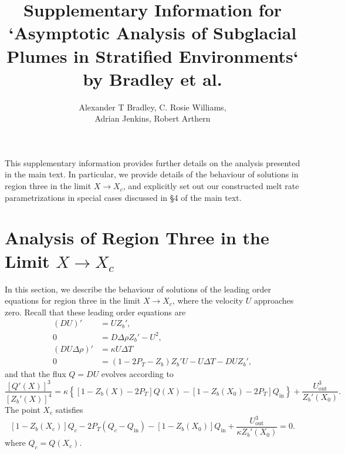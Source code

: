 \documentclass{article}
\title{Supplementary Information for `Asymptotic Analysis of Subglacial Plumes in Stratified Environments` by Bradley et al.}
\author{Alexander T Bradley, C. Rosie Williams, \\ Adrian Jenkins, Robert Arthern}
\date{}
\begin{document}
\maketitle
\newcommand{\Pb}{\textit{P}_B}  %
\newcommand{\lt}{\delta} %
\newcommand{\Pt}{\textit{P}_T}
\renewcommand{\in}{\text{in}} %
\newcommand{\out}{\text{out}}
\newcommand{\order}[1]{\mathcal{O}(#1)}

This supplementary information provides further details on the analysis presented in the main text. In particular, we provide details of the behaviour of solutions in region three in the limit $X \to X_c$, and explicitly set out our constructed melt rate parametrizations in special cases discussed in \S4 of the main text.

\section{Analysis of Region Three in the Limit $X \to X_c$}
In this section, we describe the behaviour of solutions of the leading order equations for region three in the limit $X \to X_c$, where the velocity $U$ approaches zero. Recall that these leading order equations are 
\begin{align}
 (DU)' &= U Z_b', \label{E:Region3:mass} \\
0 &= D \Delta \rho Z_b' - U^2, \label{E:Region3:mom}\\
(DU\Delta \rho)'  &=\kappa U \Delta T  \label{E:Region3:buoyancy}\\
0&= (1  - 2\Pt -  Z_b)Z_b'U- U\Delta T - DU Z_b',\label{E:Region3:thermal}
\end{align}
and that the flux $Q = DU$ evolves according to
\begin{equation}\label{E:Region3:Q_ODE}
\frac{\left[Q'(X)\right]^3}{\left[Z_b'(X)\right]^4} = \kappa \left\{ \left[1 - Z_b(X) - 2P_T\right] Q(X) - \left[1 - Z_b(X_0) - 2P_T\right]Q_\text{in}\right\} + \frac{U_\text{out}^3}{Z_b'(X_0)}.
\end{equation}
The point $X_c$ satisfies 
\begin{equation}
\left[1 - Z_b(X_c)\right]Q_c - 2\Pt\left(Q_c - Q_\in\right) -\left[1 - Z_b(X_0)\right]Q_\in +  \frac{U_\out^3}{\kappa Z_b'(X_0)} = 0.
\end{equation}
where $Q_c = Q(X_c)$.
\end{document}
